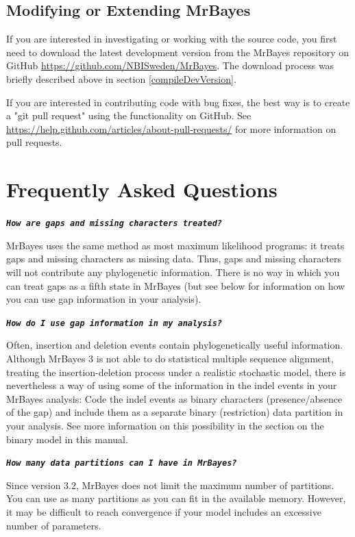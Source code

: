 \documentclass[12pt]{book}
\newcommand{\tb}[1]{\texttt{\textbf{#1}} }
\begin{document}
\subsection{Modifying or Extending MrBayes}

If you are interested in investigating or working with the source code, you first need to download
the latest development version from the MrBayes repository on GitHub
\url{https://github.com/NBISweden/MrBayes}. The download process was briefly described above in
section \ref{compileDevVersion}.

If you are interested in contributing code with bug fixes, the best way is to create a "git pull
request" using the functionality on GitHub. See
\url{https://help.github.com/articles/about-pull-requests/} for more information on pull requests.


\section{Frequently Asked Questions}
\label{FAQ}

\tb{\it{How are gaps and missing characters treated?}}

MrBayes uses the same method as most maximum likelihood programs: it treats gaps and missing
characters as missing data. Thus, gaps and missing characters will not contribute any phylogenetic
information. There is no way in which you can treat gaps as a fifth state in MrBayes (but see below
for information on how you can use gap information in your analysis).

\tb{\it{How do I use gap information in my analysis?}}

Often, insertion and deletion events contain phylogenetically useful information.  Although MrBayes
3 is not able to do statistical multiple sequence alignment, treating the insertion-deletion
process under a realistic stochastic model, there is nevertheless a way of using some of the
information in the indel events in your MrBayes analysis: Code the indel events as binary
characters (presence/absence of the gap) and include them as a separate binary (restriction) data
partition in your analysis. See more information on this possibility in the section on the binary
model in this manual.

\tb{\it{How many data partitions can I have in MrBayes?}}

Since version 3.2, MrBayes does not limit the maximum number of partitions. You can use as many
partitions as you can fit in the available memory. However, it may be difficult to reach
convergence if your model includes an excessive number of parameters.
\end{document}
